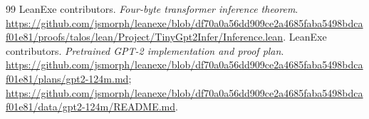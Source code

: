 \documentclass[11pt]{article}
\begin{document}
\begin{thebibliography}{99}
 LeanExe contributors. \emph{Four-byte transformer inference theorem}. \url{https://github.com/jsmorph/leanexe/blob/df70a0a56dd909ce2a4685faba5498bdcaf01e81/proofs/talos/lean/Project/TinyGpt2Infer/Inference.lean}.
 LeanExe contributors. \emph{Pretrained GPT-2 implementation and proof plan}. \url{https://github.com/jsmorph/leanexe/blob/df70a0a56dd909ce2a4685faba5498bdcaf01e81/plans/gpt2-124m.md}; \url{https://github.com/jsmorph/leanexe/blob/df70a0a56dd909ce2a4685faba5498bdcaf01e81/data/gpt2-124m/README.md}.
\end{thebibliography}
\end{document}
